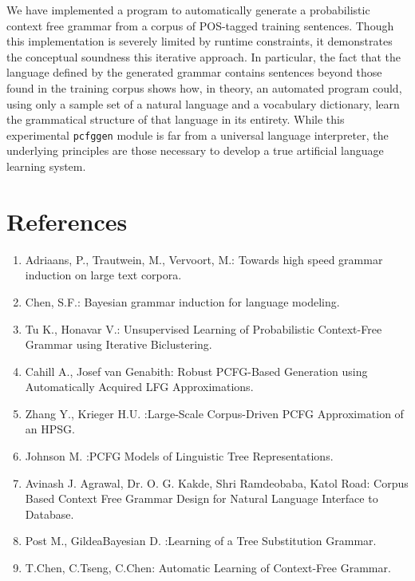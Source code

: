 \documentclass[paper=a4, fontsize=11pt]{scrartcl} %
\numberwithin{equation}{section} %
\numberwithin{figure}{section} %
\numberwithin{table}{section} %
\begin{document}
We have implemented a program to automatically generate a probabilistic context free grammar from a corpus of POS-tagged training sentences. Though this implementation is severely limited by runtime constraints, it demonstrates the conceptual soundness this iterative approach. In particular, the fact that the language defined by the generated grammar contains sentences beyond those found in the training corpus shows how, in theory, an automated program could, using only a sample set of a natural language and a vocabulary dictionary, learn the grammatical structure of that language in its entirety. While this experimental \texttt{pcfggen} module is far from a universal language interpreter, the underlying principles are those necessary to develop a true artificial language learning system.

\section{References}
\begin{enumerate}[1. ]
\item Adriaans, P., Trautwein, M., Vervoort, M.: Towards high speed grammar induction on large text corpora.
\item Chen, S.F.: Bayesian grammar induction for language modeling.
\item Tu K., Honavar V.: Unsupervised Learning of Probabilistic Context-Free Grammar using Iterative Biclustering.
\item Cahill A., Josef van Genabith: Robust PCFG-Based Generation using Automatically Acquired LFG Approximations.
\item Zhang Y., Krieger H.U. :Large-Scale Corpus-Driven PCFG Approximation of an HPSG.
\item Johnson M. :PCFG Models of Linguistic Tree Representations.
\item Avinash J. Agrawal, Dr. O. G. Kakde, Shri Ramdeobaba, Katol Road: Corpus Based Context Free Grammar Design for Natural Language Interface to Database.
\item Post M., GildeaBayesian D. :Learning of a Tree Substitution Grammar.
\item T.Chen, C.Tseng, C.Chen: Automatic Learning of Context-Free Grammar.
\end{enumerate}
\end{document}
